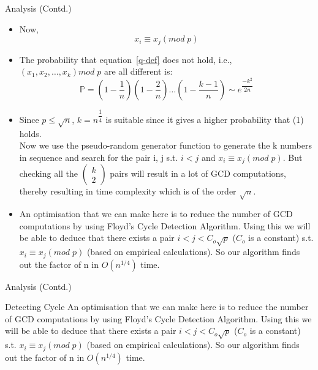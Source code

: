 \documentclass{beamer}
\begin{document}
\begin{frame}{Analysis (Contd.)}
\begin{itemize}
    \item Now, 
    \begin{equation}
      \label{q-def}
     x_{i}\equiv x_{j}\left( mod \; p\right)
    \end{equation}
    \item The probability that equation~\eqref{q-def} does not hold, i.e., $\left( x_{1},x_{2},\ldots ,x_{k}\right) mod \; p $ are all different is:
    \begin{equation}
    \mathbb{P} = \left( 1-\dfrac {1}{n}\right) \left( 1-\dfrac {2}{n}\right) \ldots \left( 1-\dfrac {k-1}{n}\right) 
    \sim e^{\dfrac {-k^{2}}{2n}}
    \end{equation}
    \item Since $p \leq \sqrt{n}$, $k = n^{\dfrac {1}{4}}$ is suitable since it gives a higher probability that (1) holds.\\
    Now we use the pseudo-random generator function to generate the k numbers in sequence and search for the pair i, j s.t. $i < j$ and $x_{i} \equiv x_{j} \left( mod \; p \right). $ But checking all the $\begin{pmatrix}
    k \\ 2 \end{pmatrix}$ pairs will result in a lot of GCD computations, thereby resulting in time complexity which is of the order $\sqrt {n}$. \break \break
    \item An optimisation that we can make here is to reduce the number of GCD computations by using Floyd's Cycle Detection Algorithm. Using this
    we will be able to deduce that there exists a pair $i < j < C_{o}\sqrt{p}$ \quad ($C_{o}$ is a constant) s.t. $x_{i} \equiv x_{j} \left( mod \; p \right)$ (based on empirical calculations). So our algorithm finds out the factor of n in $O\left( n^{1/4}\right)$ time.
\end{itemize}
\end{frame}



\begin{frame}{Analysis (Contd.)}
\begin{block}{Detecting Cycle}
    An optimisation that we can make here is to reduce the number of GCD computations by using Floyd's Cycle Detection Algorithm. Using this
    we will be able to deduce that there exists a pair $i < j < C_{o}\sqrt{p}$ \quad ($C_{o}$ is a constant) s.t. $x_{i} \equiv x_{j} \left( mod \; p \right)$ (based on empirical calculations). So our algorithm finds out the factor of n in $O\left( n^{1/4}\right)$ time.
    \end{block}
\end{frame}
\end{document}
